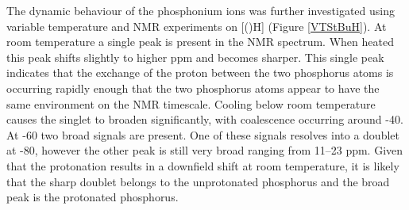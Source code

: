 
The dynamic behaviour of the phosphonium ions was further investigated using variable temperature \phosphorus{} and \proton{} NMR experiments on [(\tButhixantphos)H] (Figure \ref{VTStBuH}).  At room temperature a single peak is present in the \phosphorus{} NMR spectrum.  When heated this peak shifts slightly to higher ppm and becomes sharper.  This single peak indicates that the exchange of the proton between the two phosphorus atoms is occurring rapidly enough that the two phosphorus atoms appear to have the same environment on the NMR timescale.  Cooling below room temperature causes the singlet to broaden significantly, with coalescence occurring around -40\degC{}.  At -60\degC{} two broad signals are present.  One of these signals resolves into a doublet at -80\degC, however the other peak is still very broad ranging from 11--23 ppm.  Given that the protonation results in a downfield shift at room temperature, it is likely that the sharp doublet belongs to the unprotonated phosphorus and the broad peak is the protonated phosphorus.


